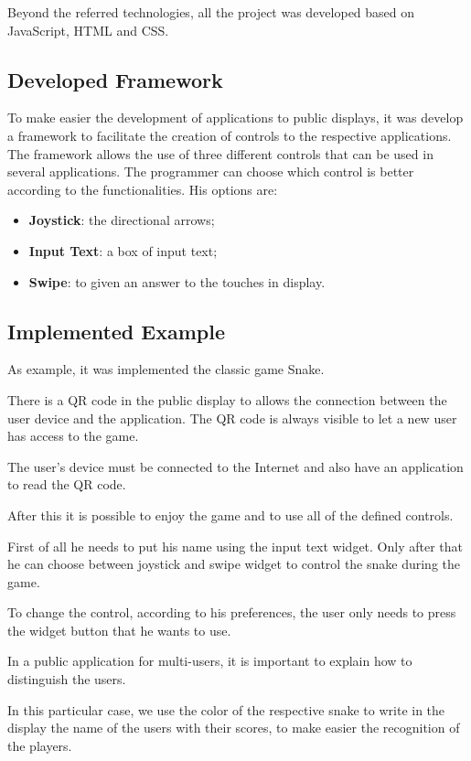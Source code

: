 \documentclass[9pt,a4paper]{extarticle}
\begin{document}
\begin{multicols}{2}
Beyond the referred technologies, all the project was developed based on JavaScript, HTML and CSS.

\subsection{Developed Framework} 

To make easier the development of applications to public displays, it was develop a framework to facilitate the creation of controls to the respective applications.
The framework allows the use of three different controls that can be used in several applications.
The programmer can choose which control is better according to the functionalities. His options are:

\begin{itemize}
\item \textbf{Joystick}: the directional arrows;
\item \textbf{Input Text}: a box of input text;
\item \textbf{Swipe}: to given an answer to the touches in display.
\end{itemize}

\subsection{Implemented Example}

As example, it was implemented the classic game Snake.

There is a QR code in the public display to allows the connection between the user device and the application. The QR code is always visible to let a new user has access to the game.

The user's device must be connected to the Internet and also have an application to read the QR code.

After this it is possible to enjoy the game and to use all of the defined controls.

First of all he needs to put his name using the input text widget. Only after that he can choose between joystick and swipe widget to control the snake during the game.

To change the control, according to his preferences, the user only needs to press the widget button that he wants to use.

In a public application for multi-users, it is important to explain how to distinguish the users.

In this particular case, we use the color of the respective snake to write in the display the name of the users with their scores, to make easier the recognition of the players.


\end{multicols}
\end{document}
